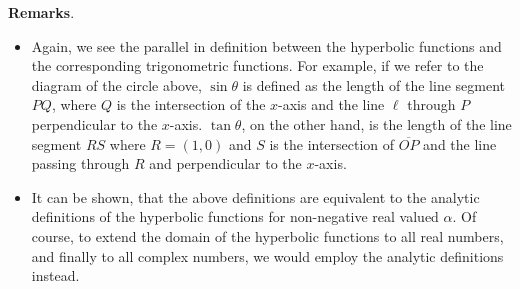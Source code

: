 \documentclass[12pt]{article}
\begin{document}
\textbf{Remarks}.
\begin{itemize}
\item Again, we see the parallel in definition between the hyperbolic functions and the corresponding trigonometric functions.  For example, if we refer to the diagram of the circle above, $\sin \theta$ is defined as the length of the line segment $PQ$, where $Q$ is the intersection of the $x$-axis and the line $\ell$ through $P$ perpendicular to the $x$-axis.  $\tan \theta$, on the other hand, is the length of the line segment $RS$ where $R=(1,0)$ and $S$ is the intersection of $\overline{OP}$ and the line passing through $R$ and perpendicular to the $x$-axis.
\item It can be shown, that the above definitions are equivalent to the analytic definitions of the hyperbolic functions for non-negative real valued $\alpha$.  Of course, to extend the domain of the hyperbolic functions to all real numbers, and finally to all complex numbers, we would employ the analytic definitions instead.
\end{itemize}
\end{document}
